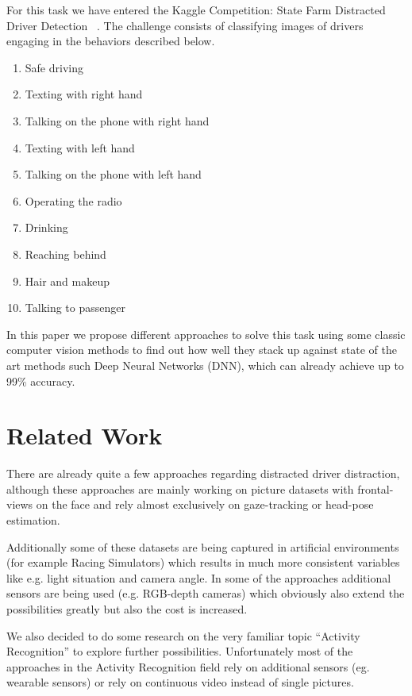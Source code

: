 \documentclass[10pt,twocolumn,letterpaper]{article}
\begin{document}
For this task we have entered the Kaggle Competition: State Farm Distracted Driver Detection ~\cite{Kaggle}. The challenge consists of classifying images of drivers engaging in the behaviors described below.

\begin{enumerate}
	\item Safe driving
	\item Texting with right hand
	\item Talking on the phone with right hand
	\item Texting with left hand
	\item Talking on the phone with left hand
	\item Operating the radio
	\item Drinking
	\item Reaching behind
	\item Hair and makeup
	\item Talking to passenger
\end{enumerate}

In this paper we propose different approaches to solve this task using some classic computer vision methods to find out how well they stack up against state of the art methods such Deep Neural Networks (DNN), which can already achieve up to 99\% accuracy.



\section{Related Work}

There are already quite a few approaches regarding distracted driver distraction, although these approaches are mainly working on picture datasets with frontal-views on the face and rely almost exclusively on gaze-tracking or head-pose estimation. \cite{Dorazio} \cite{6957817}

Additionally some of these datasets are being captured in artificial environments (for example Racing Simulators) \cite{itsc:bergasa2008} which results in much more consistent variables like e.g. light situation and camera angle. In some of the approaches additional sensors are being used (e.g. RGB-depth cameras) which obviously also extend the possibilities greatly but also the cost is increased. \cite{Ragab2014}

We also decided to do some research on the very familiar topic ``Activity Recognition'' to explore further possibilities. Unfortunately most of the approaches in the Activity Recognition field rely on additional sensors (eg. wearable sensors) \cite{6258525} \cite{6365160} or rely on continuous video instead of single pictures. \cite{1315249} \cite{1430826}
\end{document}
